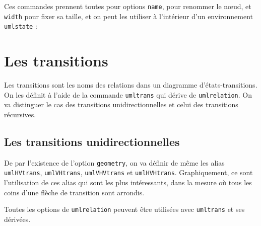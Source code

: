 \documentclass[a4paper,11pt]{report}
\newcommand{\inputTikZ}[1]{%
  }%
\newcommand{\inputTikZ}[1]{%
    \texttt{[image: fig/\#1.pdf]}%
  }%
\begin{document}
\medskip

Ces commandes prennent toutes pour options {\tt name}, pour renommer le n\oe{}ud, et {\tt width} pour fixer sa taille, et on peut les utiliser à l'intérieur d'un environnement {\tt umlstate} :

\medskip

\begin{minipage}{0.51\textwidth}

\end{minipage}
\begin{minipage}{0.49\textwidth}
\begin{center}
\inputTikZ{figure54}
\end{center}
\end{minipage}

\medskip

\section{Les transitions}\label{s.trans}

Les transitions sont les noms des relations dans un diagramme d'états-transitions. On les définit à l'aide de la commande {\tt umltrans} qui dérive de {\tt umlrelation}. On va distinguer le cas des transitions unidirectionnelles et celui des transitions récursives.

\subsection{Les transitions unidirectionnelles}\label{s.unitrans}

De par l'existence de l'option {\tt geometry}, on va définir de même les alias {\tt umlHVtrans}, {\tt umlVHtrans}, {\tt umlVHVtrans} et {\tt umlHVHtrans}. Graphiquement, ce sont l'utilisation de ces alias qui sont les plus intéressants, dans la mesure où tous les coins d'une flèche de transition sont arrondis.

\medskip

\begin{minipage}{0.51\textwidth}

\end{minipage}
\begin{minipage}{0.49\textwidth}
\begin{center}
\inputTikZ{figure55}
\end{center}
\end{minipage}

\medskip

Toutes les options de {\tt umlrelation} peuvent être utilisées avec {\tt umltrans} et ses dérivées.
\end{document}
